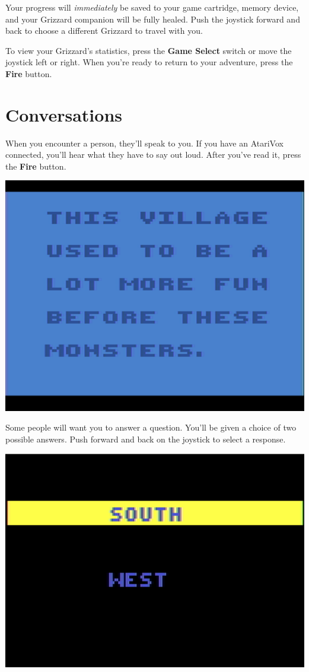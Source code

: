 \documentclass[9pt,twocolumn,openany,article]{memoir}
\begin{document}
\ifdefined\NOSAVE\else Your progress will \emph{immediately} be saved to
your \ifdefined\ATARIAGESAVE  game cartridge,  \else memory  device, \fi
\fi   and    your   Grizzard    companion   will   be    fully   healed.
\ifdefined\NOSAVE\else  Push the  joystick  forward and  back to  choose
a different Grizzard to travel with you. \fi

To  view  your Grizzard's  statistics,  press  the \textbf{Game  Select}
switch or move  the joystick left or right. When  you're ready to return
to your adventure, press the \textbf{Fire} button.

\section{Conversations}

When  you encounter  a person,  they'll  speak to  you. If  you have  an
AtariVox  connected,  you'll  hear  what  they have  to  say  out  loud.
After you've read it, press the \textbf{Fire} button.

\begin{center}
  \includegraphics[width=.75\columnwidth]{../Manual/TextNTSC.png}
\end{center}

Some people will want you to answer a question. You'll be given a choice
of two possible answers. Push forward and back on the joystick to select
a response.

\begin{center}
  \includegraphics[width=.75\columnwidth]{../Manual/InquireNTSC.png}
\end{center}
\end{document}
